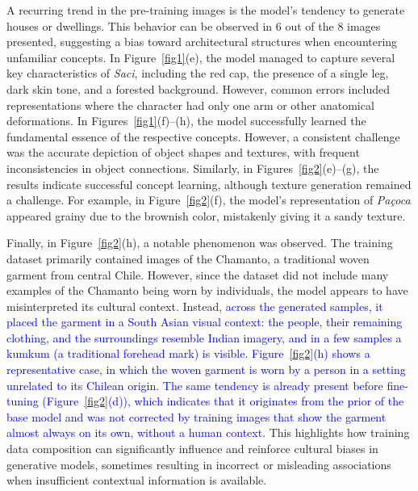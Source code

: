 \documentclass[pdflatex,sn-mathphys-num]{sn-jnl}%
\theoremstyle{thmstyleone}%
\theoremstyle{thmstyletwo}%
\theoremstyle{thmstylethree}%
\begin{document}
A recurring trend in the pre-training images is the model’s tendency to generate houses or dwellings. This behavior can be observed in $6$ out of the $8$ images presented, suggesting a bias toward architectural structures when encountering unfamiliar concepts. In Figure~\ref{fig1}(e), the model managed to capture several key characteristics of \textit{Saci}, including the red cap, the presence of a single leg, dark skin tone, and a forested background. However, common errors included representations where the character had only one arm or other anatomical deformations. In Figures~\ref{fig1}(f)--(h), the model successfully learned the fundamental essence of the respective concepts. However, a consistent challenge was the accurate depiction of object shapes and textures, with frequent inconsistencies in object connections. Similarly, in Figures~\ref{fig2}(e)--(g), the results indicate successful concept learning, although texture generation remained a challenge. For example, in Figure~\ref{fig2}(f), the model’s representation of \textit{Pa\c{c}oca} appeared grainy due to the brownish color, mistakenly giving it a sandy texture.

Finally, in Figure~\ref{fig2}(h), a notable phenomenon was observed. The training dataset primarily contained images of the Chamanto, a traditional woven garment from central Chile. However, since the dataset did not include many examples of the Chamanto being worn by individuals, the model appears to have misinterpreted its cultural context. Instead, \textcolor{blue}{across the generated samples, it placed the garment in a South Asian visual context: the people, their remaining clothing, and the surroundings resemble Indian imagery, and in a few samples a kumkum (a traditional forehead mark) is visible. Figure~\ref{fig2}(h) shows a representative case, in which the woven garment is worn by a person in a setting unrelated to its Chilean origin. The same tendency is already present before fine-tuning (Figure~\ref{fig2}(d)), which indicates that it originates from the prior of the base model and was not corrected by training images that show the garment almost always on its own, without a human context.} This highlights how training data composition can significantly influence and reinforce cultural biases in generative models, sometimes resulting in incorrect or misleading associations when insufficient contextual information is available.
\end{document}
